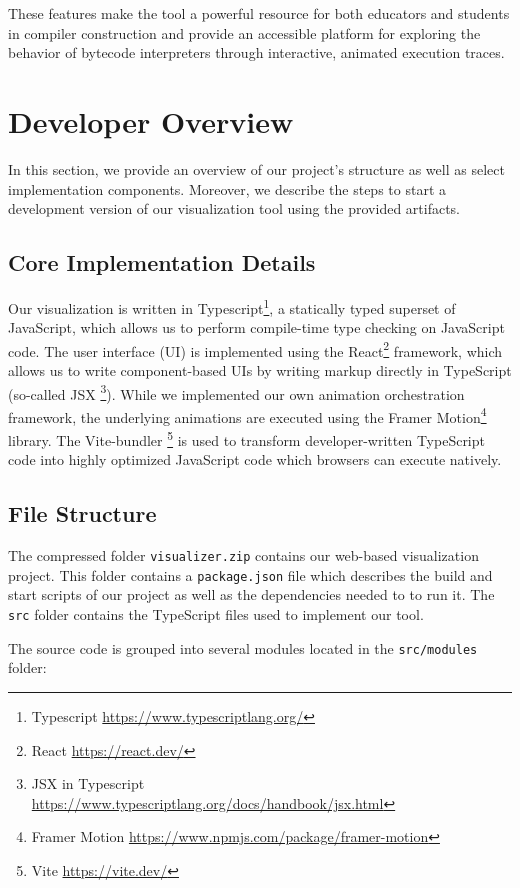 \documentclass[conference]{IEEEtran}
\begin{document}
These features make the tool a powerful resource for both educators and students in compiler construction and provide an accessible platform for exploring the behavior of bytecode interpreters through interactive, animated execution traces.

\section{Developer Overview}

In this section, we provide an overview of our project's structure as well as select implementation components. Moreover, we describe the steps to start a development version of our visualization tool using the provided artifacts. 

\subsection{Core Implementation Details}

Our visualization is written in Typescript\footnote{Typescript \url{https://www.typescriptlang.org/}}, a statically typed superset of JavaScript, which allows us to perform compile-time type checking on JavaScript code. The user interface (UI) is implemented using the React\footnote{React \url{https://react.dev/}} framework, which allows us to write component-based UIs by writing markup directly in TypeScript (so-called JSX \footnote{JSX in Typescript \url{https://www.typescriptlang.org/docs/handbook/jsx.html}}). While we implemented our own animation orchestration framework, the underlying animations are executed using the Framer Motion\footnote{Framer Motion \url{https://www.npmjs.com/package/framer-motion}} library. The Vite-bundler \footnote{Vite \url{https://vite.dev/}} is used to transform developer-written TypeScript code into highly optimized JavaScript code which browsers can execute natively.

\subsection{File Structure}

The compressed folder \texttt{visualizer.zip} contains our web-based visualization project. This folder contains a \texttt{package.json} file which describes the build and start scripts of our project as well as the dependencies needed to to run it. The \texttt{src} folder contains the TypeScript files used to implement our tool.

The source code is grouped into several modules located in the \texttt{src/modules} folder:
\end{document}
